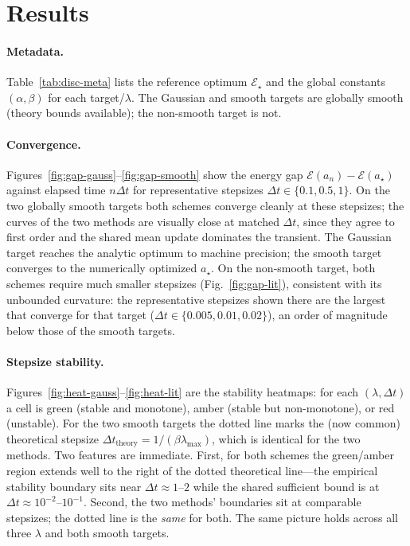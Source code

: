 \documentclass[11pt]{article}
\begin{document}
\section{Results}\label{sec:results}

\paragraph{Metadata.}
Table~\ref{tab:disc-meta} lists the reference optimum $\mathcal{E}_\star$ and the global
constants $(\alpha,\beta)$ for each target/$\lambda$. The Gaussian and smooth
targets are globally smooth (theory bounds available); the non-smooth target is not.

\begin{table}[t]
\centering
\caption{Per-target reference optimum $\mathcal{E}_\star$ and global strong-convexity /
smoothness constants $(\alpha,\beta)$. The non-smooth target is convex but not
globally smooth, so no theorem-based $(\alpha,\beta)$ is reported.}
\label{tab:disc-meta}
\end{table}

\paragraph{Convergence.}
Figures~\ref{fig:gap-gauss}--\ref{fig:gap-smooth} show the energy gap
$\mathcal{E}(a_n)-\mathcal{E}(a_\star)$ against elapsed time $n\Delta t$ for
representative stepsizes
$\Delta t\in\{0.1,0.5,1\}$. On the two globally smooth targets both schemes
converge cleanly at these stepsizes; the curves of the two methods are
visually close at matched $\Delta t$, since they agree to first order and the
shared mean update dominates the transient. The Gaussian target reaches the
analytic optimum to machine precision; the smooth target converges to the
numerically optimized $a_\star$. On the non-smooth target, both schemes require much
smaller stepsizes (Fig.~\ref{fig:gap-lit}), consistent with its unbounded
curvature: the representative stepsizes shown there are the largest that
converge for that target ($\Delta t\in\{0.005,0.01,0.02\}$), an order of
magnitude below those of the smooth targets.

\paragraph{Stepsize stability.}
Figures~\ref{fig:heat-gauss}--\ref{fig:heat-lit} are the stability heatmaps:
for each $(\lambda,\Delta t)$ a cell is green (stable and monotone), amber (stable
but non-monotone), or red (unstable). For the two smooth targets the dotted line
marks the (now common) theoretical stepsize $\Delta t_{\mathrm{theory}}=1/(\beta\lambda_{\max})$,
which is identical for the two methods. Two features are immediate. First, for both
schemes the green/amber region extends well to the right of the dotted theoretical
line---the empirical stability boundary sits near $\Delta t\approx1$--$2$ while the
shared sufficient bound is at $\Delta t\approx10^{-2}$--$10^{-1}$. Second, the two
methods' boundaries sit at comparable stepsizes; the dotted line is the \emph{same}
for both. The same picture holds across all three $\lambda$ and both smooth targets.
\end{document}

